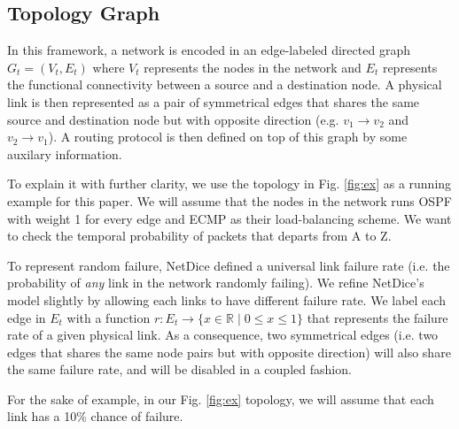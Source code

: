 \documentclass[10pt,sigconf,letterpaper,anonymous,nonacm]{acmart}
\begin{document}
\subsection{Topology Graph}
In this framework, a network is encoded in an edge-labeled directed graph 
$G_t = (V_t, E_t)$ where $V_t$ represents the nodes in the network and 
$E_t$ represents the functional connectivity between a source and a destination node. 
A physical link is then represented as a pair of symmetrical edges that shares the same source 
and destination node but with opposite direction (e.g. $v_1 \rightarrow v_2$ and $v_2 
\rightarrow v_1$).
A routing protocol is then defined on top of this graph by some auxilary information.

To explain it with further clarity, we use the topology in Fig. \ref{fig:ex} as a 
running example for this paper. 
We will assume that the nodes in the network runs OSPF with weight 1 for every edge and ECMP 
as their load-balancing scheme.
We want to check the temporal probability of packets that departs from A to Z.


To represent random failure, NetDice defined a universal link failure rate (i.e. 
the probability of \textit{any} link in the network randomly failing).
We refine NetDice's model slightly by allowing each links to have different failure rate.
We label each edge in $E_t$ with a function $r: E_t \rightarrow \{x \in \mathbb{R} \mid 0 \le x 
\le 1\}$ that represents the failure rate of a given physical link.
As a consequence, two symmetrical edges (i.e. two edges that shares the same node pairs but with 
opposite direction) will also share the same failure rate, and will be disabled in a coupled 
fashion.

For the sake of example, in our Fig. \ref{fig:ex} topology, we will assume that each link has a 
10\% chance of failure.

\end{document}
